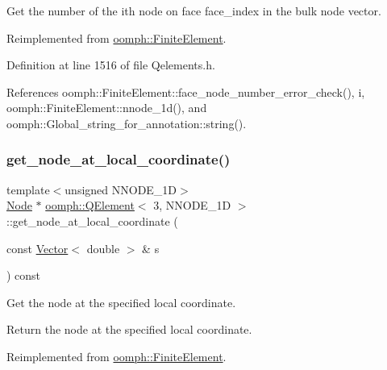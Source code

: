 Get the number of the ith node on face face\+\_\+index in the bulk node vector. 

Reimplemented from \hyperlink{classoomph_1_1FiniteElement_a2cd0ee849adf50dae1a70a20fab47119}{oomph\+::\+Finite\+Element}.



Definition at line 1516 of file Qelements.\+h.



References oomph\+::\+Finite\+Element\+::face\+\_\+node\+\_\+number\+\_\+error\+\_\+check(), i, oomph\+::\+Finite\+Element\+::nnode\+\_\+1d(), and oomph\+::\+Global\+\_\+string\+\_\+for\+\_\+annotation\+::string().

\mbox{\label{classoomph_1_1QElement_3_013_00_01NNODE__1D_01_4_aa1429001a31632bbcdb4d8660b13777c}} 
\subsubsection{\texorpdfstring{get\+\_\+node\+\_\+at\+\_\+local\+\_\+coordinate()}{get\_node\_at\_local\_coordinate()}}
{\footnotesize\ttfamily template$<$unsigned N\+N\+O\+D\+E\+\_\+1D$>$ \\
\hyperlink{classoomph_1_1Node}{Node} $\ast$ \hyperlink{classoomph_1_1QElement}{oomph\+::\+Q\+Element}$<$ 3, N\+N\+O\+D\+E\+\_\+1D $>$\+::get\+\_\+node\+\_\+at\+\_\+local\+\_\+coordinate (\begin{DoxyParamCaption}\item[{const \hyperlink{classoomph_1_1Vector}{Vector}$<$ double $>$ \&}]{s }\end{DoxyParamCaption}) const\hspace{0.3cm}{\ttfamily [virtual]}}



Get the node at the specified local coordinate. 

Return the node at the specified local coordinate. 

Reimplemented from \hyperlink{classoomph_1_1FiniteElement_a2ddbb05c5f8bb35b64bec287d653105c}{oomph\+::\+Finite\+Element}.



